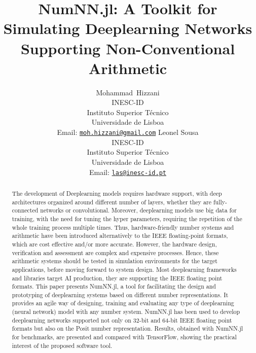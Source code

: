 \documentclass{article}
\title{NumNN.jl: A Toolkit for Simulating Deeplearning Networks Supporting Non-Conventional Arithmetic}
\author{%
	{Mohammad~Hizzani}\\
	INESC-ID\\ 
	Instituto Superior Técnico\\ 
		Universidade de Lisboa\\
		Email: \href{mailto:moh.hizzani@gmail.com}{\tt moh.hizzani@gmail.com}%
	\And
	{Leonel Sousa}\\
	INESC-ID\\ 
		Instituto Superior Técnico\\ 
		Universidade de Lisboa\\
		Email: \href{mailto:las@inesc-id.pt}{\tt las@inesc-id.pt}%
}
\begin{document}
	\maketitle

	\begin{abstract}
		The development of Deeplearning models requires hardware support, with deep architectures organized around different number of layers, whether they are fully-connected networks or convolutional. Moreover, deeplearning models use big data for training, with the need for tuning the hyper parameters, requiring the repetition of the whole training process multiple times. Thus, hardware-friendly number systems and arithmetic have been introduced alternatively to the IEEE floating-point formats, which are cost effective and/or more accurate. However, the hardware design, verification and assessment are complex and expensive processes. Hence, these arithmetic systems should be tested in simulation environments for the target applications, before moving forward to system design. Most deeplearning frameworks and libraries target AI production, they are supporting the IEEE floating point formats. This paper presents NumNN.jl, a tool for facilitating the design and prototyping of deeplearning systems based on different number representations. It provides an agile way of designing, training and evaluating any type of deeplearning (neural network) model with any number system. NumNN.jl has been used to develop deeplearning networks supported not only on 32-bit and 64-bit IEEE floating point formats but also on the Posit number representation.  Results, obtained with NumNN.jl for benchmarks, are presented and compared with TensorFlow, showing the practical interest of the proposed software tool.
	\end{abstract}

	
	
	
	
	
%	
	
	
	
\end{document}
